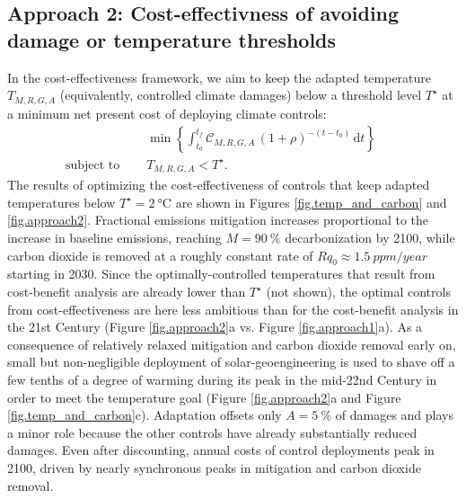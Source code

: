 \documentclass{article}
\begin{document}
\subsection{Approach 2: Cost-effectivness of avoiding damage or temperature thresholds}\label{sec.cost-effectivness}

In the cost-effectiveness framework, we aim to keep the adapted temperature $T_{M,R,G,A}$ (equivalently, controlled climate damages) below a threshold level $T^{\star}$ at a minimum net present cost of deploying climate controls:
\begin{align}
    &\min \left\{ \int_{t_{0}}^{t_{f}} \mathcal{C}_{M, R, G, A}\, (1 + \rho)^{-(t-t_{0})} \, \text{d}t \right\}\label{eq.cost_effectiveness} \quad\quad \\
    \text{subject to }\quad
    &T_{M, R, G, A} < T^{\star}.
\end{align}
The results of optimizing the cost-effectiveness of controls that keep adapted temperatures below $T^{\star} = \SI{2}{\celsius}$ are shown in Figures \ref{fig.temp_and_carbon} and \ref{fig.approach2}. Fractional emissions mitigation increases proportional to the increase in baseline emissions, reaching $M=\SI{90}{\%}$ decarbonization by 2100, while carbon dioxide is removed at a roughly constant rate of $R q_{0} \approx \SI{1.5}{ppm/year}$ starting in 2030. Since the optimally-controlled temperatures that result from cost-benefit analysis are already lower than $T^{\star}$ (not shown), the optimal controls from cost-effectiveness are here less ambitious than for the cost-benefit analysis in the 21st Century (Figure \ref{fig.approach2}a vs. Figure \ref{fig.approach1}a). As a consequence of relatively relaxed mitigation and carbon dioxide removal early on, small but non-negligible deployment of solar-geoengineering is used to shave off a few tenths of a degree of warming during its peak in the mid-22nd Century in order to meet the temperature goal (Figure \ref{fig.approach2}a and Figure \ref{fig.temp_and_carbon}c). Adaptation offsets only $A = \SI{5}{\%}$ of damages and plays a minor role because the other controls have already substantially reduced damages. Even after discounting, annual costs of control deployments peak in 2100, driven by nearly synchronous peaks in mitigation and carbon dioxide removal.
\end{document}

